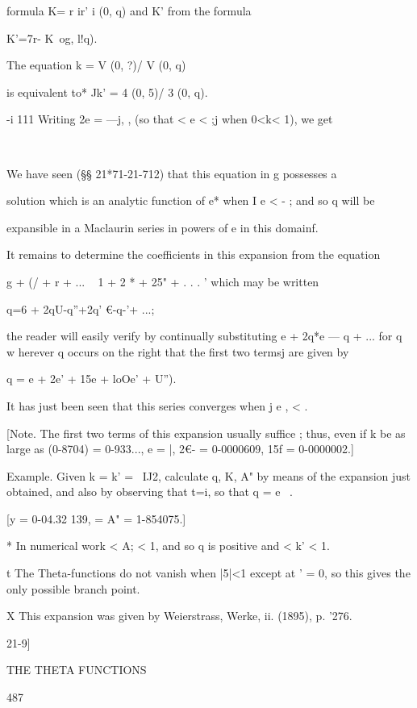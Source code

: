 formula K= r ir' i (0, q) and K' from the formula

K'=7r- K\ og, l!q).

The equation k = V (0, ?)/ V (0, q)

is equivalent to* Jk' = 4 (0, 5)/ 3 (0, q).

-i 111 Writing 2e = —j, , (so that < e < ;j when 0<k< 1), we get

\ %

We have seen (§§ 21*71-21-712) that this equation in g possesses a

solution which is an analytic function of e* when I e < - ; and so q
will be

expansible in a Maclaurin series in powers of e in this domainf.

It remains to determine the coefficients in this expansion from the
equation

g + (/ + r + ... ~ 1 + 2 * + 25" + . . . ' which may be written

q=6 + 2qU-q''+2q' €-q-'+ ...;

the reader will easily verify by continually substituting e + 2q*e — q
+ ... for q w herever q occurs on the right that the first two termsj
are given by

q = e + 2e' + 15e + loOe' + U'').

It has just been seen that this series converges when j e , < .

[Note. The first two terms of this expansion usually suffice ; thus,
even if k be as large as (0-8704) = 0-933..., e = |, 2€- = 0-0000609,
15f = 0-0000002.]

Example. Given k = k' = \ IJ2, calculate q, K, A" by means of the
expansion just obtained, and also by observing that t=i, so that q =
e~ .

[y = 0-04.32 139, = A" = 1-854075.]

* In numerical work < A; < 1, and so q is positive and < k' < 1.

t The Theta-functions do not vanish when |5|<1 except at ' = 0, so
this gives the only possible branch point.

X This expansion was given by Weierstrass, Werke, ii. (1895), p. '276.



21-9]



THE THETA FUNCTIONS



487



